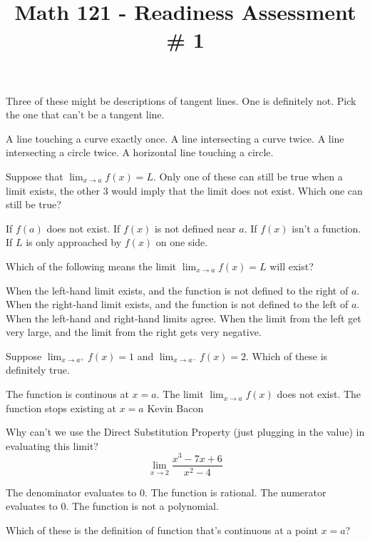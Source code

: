 \documentclass{exam}
\title{Math 121 - Readiness Assessment \# 1}
\date{}
\begin{document}
\maketitle

\begin{questions}
\question
Three of these might be descriptions of tangent lines. One is definitely not. Pick the one that can't be a tangent line.
\begin{choices}
\choice A line touching a curve exactly once.
\choice A line intersecting a curve twice.
\choice A line intersecting a circle twice.
\choice A horizontal line touching a circle. 
\end{choices}
\question
Suppose that $\lim_{x \rightarrow a} f(x) = L$. Only one of these can still be true when a limit exists, the other 3 would imply that the limit does not exist. Which one can still be true?
\begin{choices}
\choice If $f(a)$ does not exist.
\choice If $f(x)$ is not defined near $a$.
\choice If $f(x)$ isn't a function.
\choice If $L$ is only approached by $f(x)$ on one side.
\end{choices}
\question
Which of the following means the limit $\lim_{x \rightarrow a} f(x) = L$ will exist?
\begin{choices}
\choice When the left-hand limit exists, and the function is not defined to the right of $a$.
\choice When the right-hand limit exists, and the function is not defined to the left of $a$.
\choice When the left-hand and right-hand limits agree.
\choice When the limit from the left get very large, and the limit from the right gets very negative.
\end{choices}
\question
Suppose $\lim_{x\rightarrow a^+} f(x) = 1$ and $\lim_{x\rightarrow a^-} f(x) = 2$. Which of these is definitely true.
\begin{choices}
\choice The function is continous at $x=a$.
\choice The limit $\lim_{x \rightarrow a} f(x)$ does not exist.
\choice The function stops existing at $x=a$
\choice Kevin Bacon
\end{choices}
\question
Why can't we use the Direct Substitution Property (just plugging in the value) in evaluating this limit? $$\lim_{x\rightarrow 2} \frac{x^3 - 7x + 6}{x^2 -4}$$
\begin{choices}
\choice The denominator evaluates to 0.
\choice The function is rational.
\choice The numerator evaluates to 0.
\choice The function is not a polynomial.
\end{choices}
\newpage
\question Which of these is the definition of function that's continuous at a point $x=a$?

\end{questions}
\end{document}

